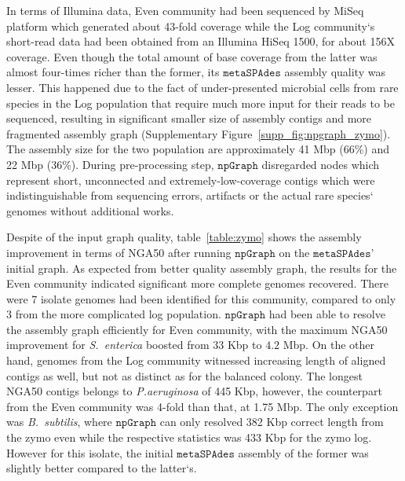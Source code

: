 \documentclass[10pt,twocolumn,twoside]{genpaper}
\newcommand{\npgraph}{$\mathtt{npGraph}$}
\begin{document}
In terms of Illumina data, Even community had been sequenced by MiSeq platform which generated about 43-fold coverage while the Log community`s short-read data had been obtained from an Illumina HiSeq 1500, for about 156X coverage.
Even though the total amount of base coverage from the latter was almost four-times richer than the former, its $\mathtt{metaSPAdes}$ assembly quality was lesser. This happened due to the fact of under-presented microbial cells from rare species in the Log population that require much more input for their reads to be sequenced, resulting in significant smaller size of assembly contigs and more fragmented assembly graph (Supplementary Figure~\ref{supp_fig:npgraph_zymo}).
The assembly size for the two population are approximately 41 Mbp (66\%) and 22 Mbp (36\%). 
During pre-processing step, \npgraph{} disregarded nodes which represent short, unconnected and extremely-low-coverage contigs which were indistinguishable from sequencing errors, artifacts or the actual rare species` genomes without additional works.

Despite of the input graph quality, table~\ref{table:zymo} shows the assembly improvement in terms of NGA50 after running \npgraph{} on the $\mathtt{metaSPAdes}$' initial graph.  
As expected from better quality assembly graph, the results for the Even community indicated significant more complete genomes recovered. 
There were 7 isolate genomes had been identified for this community, compared to only 3 from the more complicated log population.
\npgraph{} had been able to resolve the assembly graph efficiently for Even community, with the maximum NGA50 improvement for \emph{S.~enterica} boosted from $33$ Kbp to $4.2$ Mbp. 
On the other hand, genomes from the Log community witnessed increasing length of aligned contigs as well, but not as distinct as for the balanced colony. The longest NGA50 contigs belongs to \emph{P.aeruginosa} of 445 Kbp, however, the counterpart from the Even community was 4-fold than that, at 1.75 Mbp.
The only exception was \emph{B.~subtilis}, where \npgraph{} can only resolved 382 Kbp correct length from the zymo even while the respective statistics was 433 Kbp for the zymo log. However for this isolate, the initial $\mathtt{metaSPAdes}$ assembly of the former was slightly better compared to the latter`s.


\end{document}
